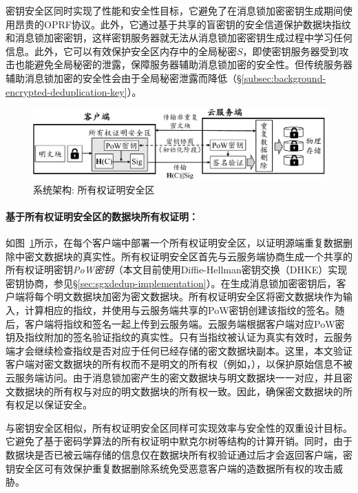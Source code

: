 密钥安全区同时实现了性能和安全性目标，它避免了在消息锁加密密钥生成期间使用昂贵的OPRF协议\cite{bellare2013DupLESS}。此外，它通过基于共享的盲密钥的安全信道保护数据块指纹和消息锁加密密钥，这样密钥服务器就无法从消息锁加密密钥生成过程中学习任何信息。此外，它可以有效保护安全区内存中的全局秘密$S$，即使密钥服务器受到攻击也能避免全局秘密的泄露，保障服务器辅助消息锁加密的安全性。但传统服务器辅助消息锁加密的安全性会由于全局秘密泄露而降低（\S\ref{subsec:background-encrypted-deduplication-key}）。

\begin{figure}[!htb]
  \centering
  \includegraphics[width=\textwidth]{pic/sgxdedup/pow.pdf}
  \caption{\sysnameS 系统架构: 所有权证明安全区}
  \label{fig:sgxdedup-overview-pow}
\end{figure}

\paragraph*{基于所有权证明安全区的数据块所有权证明：}如图~\ref{fig:sgxdedup-overview-pow}所示，\sysnameS 在每个客户端中部署一个所有权证明安全区，以证明源端重复数据删除中密文数据块的真实性。所有权证明安全区首先与云服务端协商生成一个共享的所有权证明密钥\textit{PoW密钥}（本文目前使用Diffie-Hellman密钥交换（DHKE）实现密钥协商，参见\S\ref{sec:sgxdedup-implementation}）。在生成消息锁加密密钥后，客户端将每个明文数据块加密为密文数据块。所有权证明安全区将密文数据块作为输入，计算相应的指纹，并使用与云服务端共享的PoW密钥创建该指纹的签名。随后，客户端将指纹和签名一起上传到云服务端。云服务端根据客户端对应PoW密钥及指纹附加的签名验证指纹的真实性。只有当指纹被认证为真实有效时，云服务端才会继续检查指纹是否对应于任何已经存储的密文数据块副本。这里，本文验证客户端对密文数据块的所有权而不是明文的所有权（例如，\cite{halevi11}），以保护原始信息不被云服务端访问。由于消息锁加密产生的密文数据块与明文数据块一一对应，并且密文数据块的所有权与对应的明文数据块的所有权一致。因此，确保密文数据块的所有权足以保证安全。

与密钥安全区相似，所有权证明安全区同样可实现效率与安全性的双重设计目标。它避免了基于密码学算法的所有权证明中默克尔树等结构的计算开销。同时，由于数据块是否已被云端存储的信息仅在数据块所有权验证通过后才会返回客户端，密钥安全区可有效保护重复数据删除系统免受恶意客户端的造数据所有权的攻击威胁。

